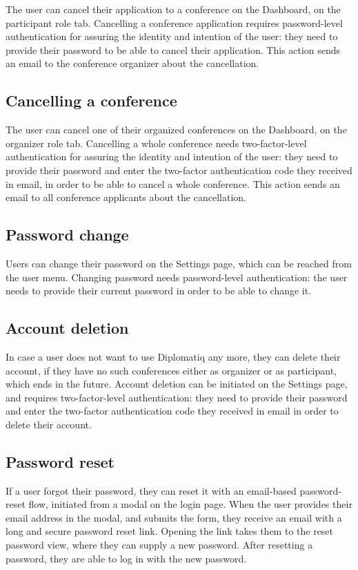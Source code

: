 The user can cancel their application to a conference on the Dashboard, on the participant role tab. Cancelling a conference application requires password-level authentication for assuring the identity and intention of the user: they need to provide their password to be able to cancel their application. This action sends an email to the conference organizer about the cancellation.

\subsection{Cancelling a conference}

The user can cancel one of their organized conferences on the Dashboard, on the organizer role tab. Cancelling a whole conference needs two-factor-level authentication for assuring the identity and intention of the user: they need to provide their password and enter the two-factor authentication code they received in email, in order to be able to cancel a whole conference. This action sends an email to all conference applicants about the cancellation.

\subsection{Password change}

Users can change their password on the Settings page, which can be reached from the user menu. Changing password needs password-level authentication: the user needs to provide their current password in order to be able to change it.

\subsection{Account deletion}

In case a user does not want to use Diplomatiq any more, they can delete their account, if they have no such conferences either as organizer or as participant, which ends in the future. Account deletion can be initiated on the Settings page, and requires two-factor-level authentication: they need to provide their password and enter the two-factor authentication code they received in email in order to delete their account.

\subsection{Password reset}

If a user forgot their password, they can reset it with an email-based password-reset flow, initiated from a modal on the login page. When the user provides their email address in the modal, and submits the form, they receive an email with a long and secure password reset link. Opening the link takes them to the reset password view, where they can supply a new password. After resetting a password, they are able to log in with the new password.

